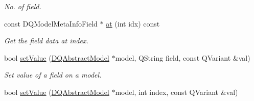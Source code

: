 \begin{DoxyCompactItemize}
\begin{DoxyCompactList}\small\item\em No. of field. \item\end{DoxyCompactList}\item 
\hypertarget{classDQModelMetaInfo_a40cc78cac34d06b7f02aa4a2bd957a4c}{
const DQModelMetaInfoField $\ast$ \hyperlink{classDQModelMetaInfo_a40cc78cac34d06b7f02aa4a2bd957a4c}{at} (int idx) const }
\label{classDQModelMetaInfo_a40cc78cac34d06b7f02aa4a2bd957a4c}

\begin{DoxyCompactList}\small\item\em Get the field data at index. \item\end{DoxyCompactList}\item 
\hypertarget{classDQModelMetaInfo_a1a901b20d122239e23a376a2b0153010}{
bool \hyperlink{classDQModelMetaInfo_a1a901b20d122239e23a376a2b0153010}{setValue} (\hyperlink{classDQAbstractModel}{DQAbstractModel} $\ast$model, QString field, const QVariant \&val)}
\label{classDQModelMetaInfo_a1a901b20d122239e23a376a2b0153010}

\begin{DoxyCompactList}\small\item\em Set value of a field on a model. \item\end{DoxyCompactList}\item 
\hypertarget{classDQModelMetaInfo_aa547f96bccec444a6494b5593249a7ff}{
bool \hyperlink{classDQModelMetaInfo_aa547f96bccec444a6494b5593249a7ff}{setValue} (\hyperlink{classDQAbstractModel}{DQAbstractModel} $\ast$model, int index, const QVariant \&val)}
\label{classDQModelMetaInfo_aa547f96bccec444a6494b5593249a7ff}


\end{DoxyCompactItemize}
